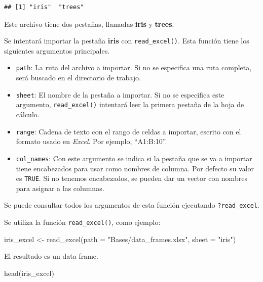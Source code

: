 \documentclass[
]{book}
\newenvironment{Shaded}{\begin{snugshade}}{\end{snugshade}}
\newcommand{\AttributeTok}[1]{\textcolor[rgb]{0.77,0.63,0.00}{#1}}
\newcommand{\FunctionTok}[1]{\textcolor[rgb]{0.00,0.00,0.00}{#1}}
\newcommand{\NormalTok}[1]{#1}
\newcommand{\OtherTok}[1]{\textcolor[rgb]{0.56,0.35,0.01}{#1}}
\newcommand{\StringTok}[1]{\textcolor[rgb]{0.31,0.60,0.02}{#1}}
\providecommand{\tightlist}{%
  \setlength{\itemsep}{0pt}\setlength{\parskip}{0pt}}
\begin{document}
\begin{verbatim}
## [1] "iris"  "trees"
\end{verbatim}

Este archivo tiene dos pestañas, llamadas \textbf{iris} y \textbf{trees}.

Se intentará importar la pestaña \textbf{iris} con \texttt{read\_excel()}. Esta función tiene los siguientes argumentos principales.

\begin{itemize}
\tightlist
\item
  \texttt{path}: La ruta del archivo a importar. Si no se especifica una ruta completa, será buscado en el directorio de trabajo.
\item
  \texttt{sheet}: El nombre de la pestaña a importar. Si no se especifica este argumento, \texttt{read\_excel()} intentará leer la primera pestaña de la hoja de cálculo.\\
\item
  \texttt{range}: Cadena de texto con el rango de celdas a importar, escrito con el formato usado en \emph{Excel}. Por ejemplo, ``A1:B:10''.\\
\item
  \texttt{col\_names}: Con este argumento se indica si la pestaña que se va a importar tiene encabezados para usar como nombres de columna. Por defecto su valor es \texttt{TRUE}. Si no tenemos encabezados, se pueden dar un vector con nombres para asignar a las columnas.
\end{itemize}

Se puede consultar todos los argumentos de esta función ejecutando \texttt{?read\_excel}.

Se utiliza la función \texttt{read\_excel()}, como ejemplo:

\begin{Shaded}
\begin{Highlighting}[]
\NormalTok{iris\_excel }\OtherTok{\textless{}{-}} \FunctionTok{read\_excel}\NormalTok{(}\AttributeTok{path =} \StringTok{"Bases/data\_frames.xlsx"}\NormalTok{, }\AttributeTok{sheet =} \StringTok{"iris"}\NormalTok{)}
\end{Highlighting}
\end{Shaded}

El resultado es un data frame.

\begin{Shaded}
\begin{Highlighting}[]
\FunctionTok{head}\NormalTok{(iris\_excel)}
\end{Highlighting}
\end{Shaded}
\end{document}
